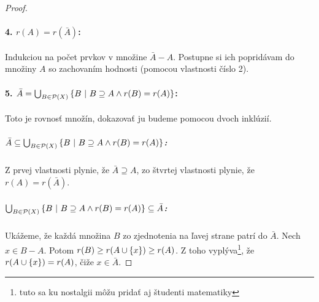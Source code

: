 \begin{proof}
\paragraph{4. $r(A) = r(\bar{A})$:} Indukciou na počet prvkov v množine  $\bar{A} - A$.
Postupne si ich popridávam do množiny $A$ so zachovaním hodnosti (pomocou vlastnosti číslo 2).
\paragraph{5. $\bar{A} = \bigcup_{B \in \mathcal{P}(X)} \left\{B ~|~ B \supseteq A \wedge r(B) = r(A)\right\}$:}
Toto je rovnosť množín, dokazovať ju budeme pomocou dvoch inklúzií.
\subparagraph{$\bar{A} \subseteq \bigcup_{B \in \mathcal{P}(X)} \left\{B ~|~ B \supseteq A \wedge r(B) = r(A)\right\}$:} Z prvej vlastnosti plynie, že $\bar{A} \supseteq A$, zo štvrtej vlastnosti plynie, že $r(A) = r(\bar{A})$.
\subparagraph{$\bigcup_{B \in \mathcal{P}(X)} \left\{B ~|~ B \supseteq A \wedge r(B) = r(A)\right\} \subseteq \bar{A}$:}
Ukážeme, že každá množina $B$ zo zjednotenia na ľavej strane patrí do $\bar{A}$.
Nech $x \in B - A$.
Potom $r(B) \geq r(A \cup \left\{x\right\}) \geq r(A)$.
Z toho vyplýva\footnote{tuto sa ku nostalgii môžu pridať aj študenti matematiky}, že $r(A \cup \left\{x\right\}) = r(A)$, čiže $x \in \bar{A}$.
\end{proof}

